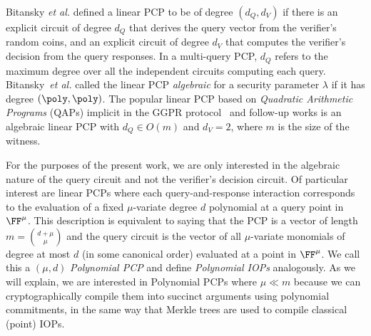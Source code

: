 Bitansky \emph{et al.} \cite{TCC:BCIOP13} defined a linear PCP to be of degree $(d_Q, d_V)$ if there is an explicit circuit of degree $d_Q$ that derives the query vector from the verifier's random coins, and an explicit circuit of degree $d_V$ that computes the verifier's decision from the query responses. %
In a multi-query PCP, $d_Q$ refers to the maximum degree over all the independent circuits computing each query. Bitansky~\emph{et al.} called the linear PCP \emph{algebraic} for a security parameter $\lambda$ if it has degree $(\poly, \poly)$. The popular linear PCP based on \emph{Quadratic Arithmetic Programs} (QAPs) implicit in the GGPR protocol~\cite{EC:GGPR13} and follow-up works is an algebraic linear PCP with $d_Q \in O(m)$ and $d_V = 2$, where $m$ is the size of the witness.

For the purposes of the present work, we are only interested in the algebraic nature of the query circuit and not the verifier's decision circuit. Of particular interest are linear PCPs where each query-and-response interaction corresponds to the evaluation of a fixed $\mu$-variate degree $d$ polynomial at a query point in $\FF^\mu$. This description is equivalent to saying that the PCP is a vector of length $m = {d + \mu \choose \mu}$ and the query circuit is the vector of all $\mu$-variate monomials of degree at most $d$ (in some canonical order) evaluated at a point in $\FF^\mu$. We call this a $(\mu, d)$ \emph{Polynomial PCP} and define \emph{Polynomial IOPs} analogously. As we will explain, we are interested in Polynomial PCPs where $\mu \ll m$ because we can cryptographically compile them into succinct arguments using polynomial commitments, in the same way that Merkle trees are used to compile classical (point) IOPs. %

